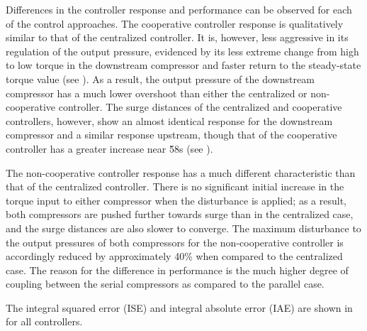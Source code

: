 Differences in the controller response and performance can be observed for each of the control approaches.
The cooperative controller response is qualitatively similar to that of the centralized controller.
It is, however, less aggressive in its regulation of the output pressure, evidenced by its less extreme change from high to low torque in the downstream compressor and faster return to the steady-state torque value (see ).
As a result, the output pressure of the downstream compressor has a much lower overshoot than either the centralized or non-cooperative controller.
The surge distances of the centralized and cooperative controllers, however, show an almost identical response for the downstream compressor and a similar response upstream, though that of the cooperative controller has a greater increase near \u{58}{s} (see ).

The non-cooperative controller response has a much different characteristic than that of the centralized controller.
There is no significant initial increase in the torque input to either compressor when the disturbance is applied; as a result, both compressors are pushed further towards surge than in the centralized case, and the surge distances are also slower to converge.
The maximum disturbance to the output pressures of both compressors for the non-cooperative controller is accordingly reduced by approximately 40\% when compared to the centralized case.
The reason for the difference in performance is the much higher degree of coupling between the serial compressors as compared to the parallel case.

The integral squared error (ISE) and integral absolute error (IAE) are shown in  for all controllers.


